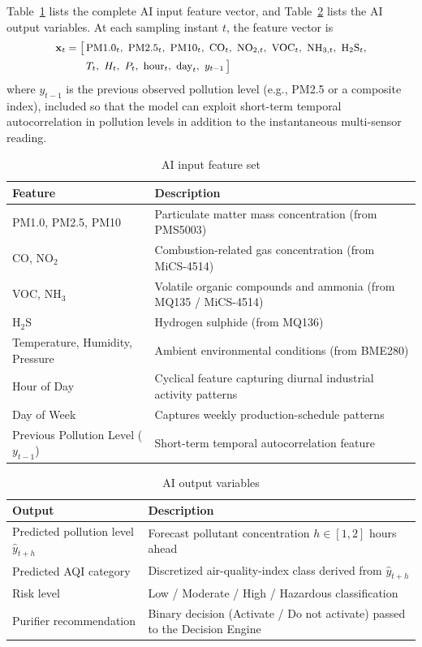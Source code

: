 Table~\ref{tab:features} lists the complete AI input feature vector, and Table~\ref{tab:ai-output} lists the AI output variables. At each sampling instant $t$, the feature vector is
\begin{equation}
\small
\begin{aligned}
\mathbf{x}_t = \big[\, &\text{PM1.0}_t,\ \text{PM2.5}_t,\ \text{PM10}_t,\ \text{CO}_t,\ \text{NO}_{2,t},\ \text{VOC}_t,\ \text{NH}_{3,t},\ \text{H}_2\text{S}_t, \\
&T_t,\ H_t,\ P_t,\ \text{hour}_t,\ \text{day}_t,\ y_{t-1} \,\big]
\end{aligned}
\label{eq:feature-vector}
\end{equation}
where $y_{t-1}$ is the previous observed pollution level (e.g., PM2.5 or a composite index), included so that the model can exploit short-term temporal autocorrelation in pollution levels in addition to the instantaneous multi-sensor reading.

\begin{table}[htbp]
\centering
\caption{AI input feature set}
\label{tab:features}
\small
\begin{tabular}{@{}p{4.5cm}p{8cm}@{}}
\toprule
\textbf{Feature} & \textbf{Description} \\
\midrule
PM1.0, PM2.5, PM10 & Particulate matter mass concentration (from PMS5003) \\
CO, NO$_2$ & Combustion-related gas concentration (from MiCS-4514) \\
VOC, NH$_3$ & Volatile organic compounds and ammonia (from MQ135 / MiCS-4514) \\
H$_2$S & Hydrogen sulphide (from MQ136) \\
Temperature, Humidity, Pressure & Ambient environmental conditions (from BME280) \\
Hour of Day & Cyclical feature capturing diurnal industrial activity patterns \\
Day of Week & Captures weekly production-schedule patterns \\
Previous Pollution Level ($y_{t-1}$) & Short-term temporal autocorrelation feature \\
\bottomrule
\end{tabular}
\end{table}

\begin{table}[htbp]
\centering
\caption{AI output variables}
\label{tab:ai-output}
\small
\begin{tabular}{@{}p{4.5cm}p{8cm}@{}}
\toprule
\textbf{Output} & \textbf{Description} \\
\midrule
Predicted pollution level $\hat{y}_{t+h}$ & Forecast pollutant concentration $h \in [1,2]$ hours ahead \\
Predicted AQI category & Discretized air-quality-index class derived from $\hat{y}_{t+h}$ \\
Risk level & Low / Moderate / High / Hazardous classification \\
Purifier recommendation & Binary decision (Activate / Do not activate) passed to the Decision Engine \\
\bottomrule
\end{tabular}
\end{table}

